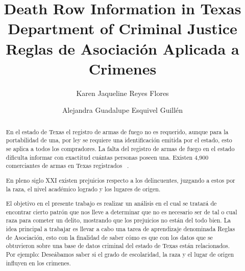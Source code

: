 \documentclass[sigconf]{acmart}
\begin{document}
\title{Death Row Information in Texas Department of Criminal Justice \\ Reglas de Asociación Aplicada a Crimenes}
\author{Karen Jaqueline Reyes Flores}

\author{Alejandra Guadalupe Esquivel Guillén}
\renewcommand{\shortauthors}{MINERIA DE DATOS}
\renewcommand{\abstractname}{Resumen}
\begin{abstract}
En el estado de Texas el registro de armas de fuego no es requerido, aunque para la portabilidad de una, por ley se requiere una identificación emitida por el estado, esto se aplica a todos los compradores. La falta del registro de armas de fuego en el estado dificulta informar con exactitud cuántas personas poseen una. Existen 4,900 comerciantes de armas en Texas registrados ~\cite{infoArmas}.

En pleno siglo XXI existen prejuicios respecto a los delincuentes, juzgando a estos por la raza, el nivel académico logrado y los lugares de origen.

El objetivo en el presente trabajo es realizar un análisis en el cual se tratará de encontrar cierto patrón que nos lleve a determinar que no es necesario ser de tal o cual raza para cometer un delito, mostrando que los prejuicios no están del todo bien.
La idea principal a trabajar es llevar a cabo una tarea de aprendizaje denominada Reglas de Asociación, esto con la finalidad de saber cómo es que con los datos que se obtuvieron sobre una base de datos criminal del estado de Texas están relacionados.
\\Por ejemplo: Deseábamos saber si el grado de escolaridad, la raza y el lugar de origen influyen en los crimenes.

\end{abstract}

\end{document}
